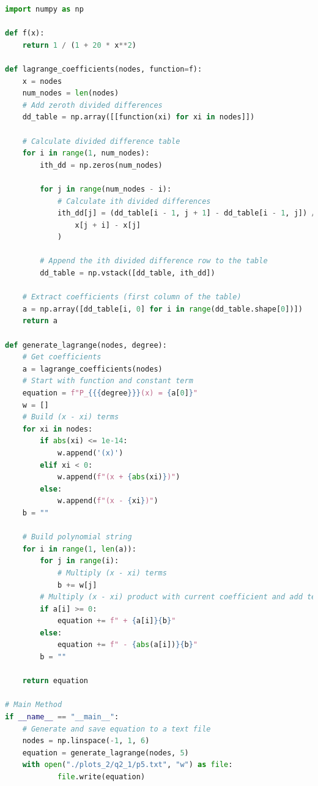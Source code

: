 \documentclass[12pt]{article}
\begin{document}
\begin{lstlisting}[language=Python, caption=2.1 Python]
import numpy as np

def f(x):
    return 1 / (1 + 20 * x**2)

def lagrange_coefficients(nodes, function=f):
    x = nodes
    num_nodes = len(nodes)
    # Add zeroth divided differences
    dd_table = np.array([[function(xi) for xi in nodes]])

    # Calculate divided difference table
    for i in range(1, num_nodes):
        ith_dd = np.zeros(num_nodes)

        for j in range(num_nodes - i):
            # Calculate ith divided differences
            ith_dd[j] = (dd_table[i - 1, j + 1] - dd_table[i - 1, j]) / (
                x[j + i] - x[j]
            )

        # Append the ith divided difference row to the table
        dd_table = np.vstack([dd_table, ith_dd])

    # Extract coefficients (first column of the table)
    a = np.array([dd_table[i, 0] for i in range(dd_table.shape[0])])
    return a

def generate_lagrange(nodes, degree):
    # Get coefficients
    a = lagrange_coefficients(nodes)
    # Start with function and constant term
    equation = f"P_{{{degree}}}(x) = {a[0]}"
    w = []
    # Build (x - xi) terms
    for xi in nodes:
        if abs(xi) <= 1e-14:
            w.append('(x)')
        elif xi < 0:
            w.append(f"(x + {abs(xi)})")
        else:
            w.append(f"(x - {xi})")
    b = ""

    # Build polynomial string
    for i in range(1, len(a)):
        for j in range(i):
            # Multiply (x - xi) terms
            b += w[j]
        # Multiply (x - xi) product with current coefficient and add term
        if a[i] >= 0:
            equation += f" + {a[i]}{b}"
        else:
            equation += f" - {abs(a[i])}{b}"
        b = ""

    return equation

# Main Method
if __name__ == "__main__":
    # Generate and save equation to a text file
    nodes = np.linspace(-1, 1, 6)
    equation = generate_lagrange(nodes, 5)
    with open("./plots_2/q2_1/p5.txt", "w") as file:
            file.write(equation)

\end{lstlisting}
\end{document}
